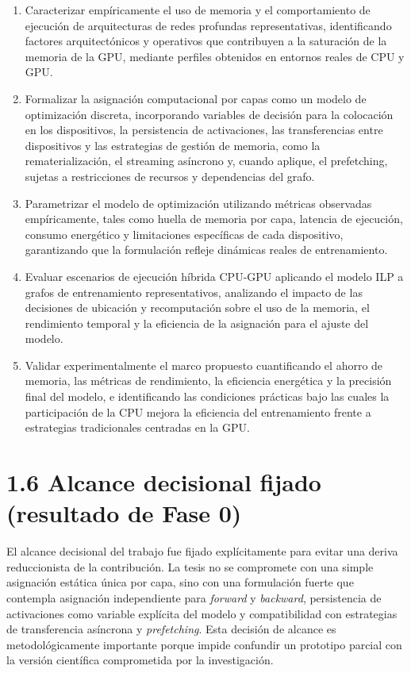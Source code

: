 \begin{enumerate}
\item Caracterizar empíricamente el uso de memoria y el comportamiento de ejecución de arquitecturas de redes profundas representativas, identificando factores arquitectónicos y operativos que contribuyen a la saturación de la memoria de la GPU, mediante perfiles obtenidos en entornos reales de CPU y GPU.
\item Formalizar la asignación computacional por capas como un modelo de optimización discreta, incorporando variables de decisión para la colocación en los dispositivos, la persistencia de activaciones, las transferencias entre dispositivos y las estrategias de gestión de memoria, como la rematerialización, el streaming asíncrono y, cuando aplique, el prefetching, sujetas a restricciones de recursos y dependencias del grafo.
\item Parametrizar el modelo de optimización utilizando métricas observadas empíricamente, tales como huella de memoria por capa, latencia de ejecución, consumo energético y limitaciones específicas de cada dispositivo, garantizando que la formulación refleje dinámicas reales de entrenamiento.
\item Evaluar escenarios de ejecución híbrida CPU-GPU aplicando el modelo ILP a grafos de entrenamiento representativos, analizando el impacto de las decisiones de ubicación y recomputación sobre el uso de la memoria, el rendimiento temporal y la eficiencia de la asignación para el ajuste del modelo.
\item Validar experimentalmente el marco propuesto cuantificando el ahorro de memoria, las métricas de rendimiento, la eficiencia energética y la precisión final del modelo, e identificando las condiciones prácticas bajo las cuales la participación de la CPU mejora la eficiencia del entrenamiento frente a estrategias tradicionales centradas en la GPU.
\end{enumerate}

\section{1.6 Alcance decisional fijado (resultado de Fase 0)}
El alcance decisional del trabajo fue fijado explícitamente para evitar una deriva reduccionista de la contribución. La tesis no se compromete con una simple asignación estática única por capa, sino con una formulación fuerte que contempla asignación independiente para \textit{forward} y \textit{backward}, persistencia de activaciones como variable explícita del modelo y compatibilidad con estrategias de transferencia asíncrona y \textit{prefetching}. Esta decisión de alcance es metodológicamente importante porque impide confundir un prototipo parcial con la versión científica comprometida por la investigación.

